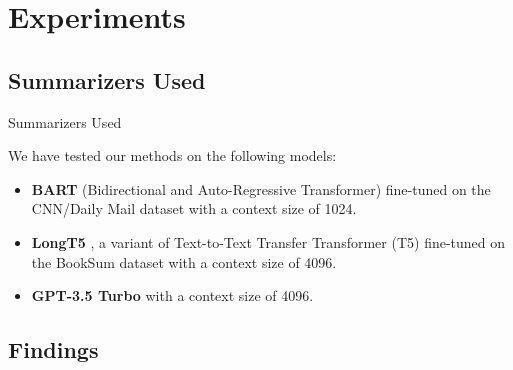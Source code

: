 \section{Experiments}


\subsection{Summarizers Used}

\begin{frame}{Summarizers Used}

  We have tested our methods on the following models:

  \begin{itemize}
    \item \textbf{BART} (Bidirectional and Auto-Regressive Transformer) \citep{lewis-etal-2020-bart} fine-tuned on the CNN/Daily Mail dataset with a context size of 1024.
    \item \textbf{LongT5} \citep{guo2021longt5}, a variant of Text-to-Text Transfer Transformer (T5) \citep{raffel2020exploring} fine-tuned on the BookSum dataset with a context size of 4096.
    \item \textbf{GPT-3.5 Turbo} \citep{brown2020language} with a context size of 4096.
  \end{itemize}

\end{frame}


\subsection{Findings}

